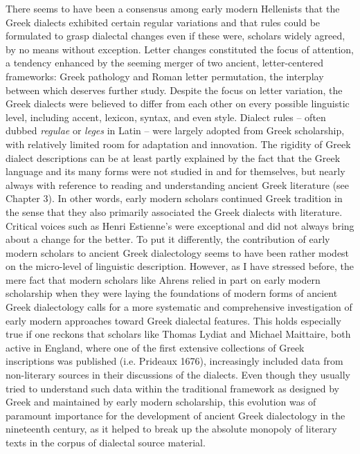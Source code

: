 \documentclass[12pt]{article}
\makeatletter
\renewcommand\subsection{\@startsection{subsection}{2}{0.1972in}{0.1665in}{0.0835in}{\normalfont\normalsize\fontsize{12pt}{14.4pt}\selectfont\rmfamily\bfseries}}
\newenvironment{styleStandard}{\renewcommand\baselinestretch{1.25}\setlength\leftskip{0in}\setlength\rightskip{0in}\setlength\parindent{0.1972in}\setlength\parfillskip{0pt plus 1fil}\setlength\parskip{0in plus 1pt}\writerlistparindent\writerlistleftskip\leavevmode\normalfont\normalsize\writerlistlabel\ignorespaces}{\unskip\vspace{0in plus 1pt}\par}
\newcommand\writerlistleftskip{}
\newcommand\writerlistparindent{}
\newcommand\writerlistlabel{}
\makeatother
\begin{document}
\subsection{Conclusion}
\hypertarget{Toc19704848}{}\begin{styleStandard}
There seems to have been a consensus among early modern Hellenists that the Greek dialects exhibited certain regular variations and that rules could be formulated to grasp dialectal changes even if these were, scholars widely agreed, by no means without exception. Letter changes constituted the focus of attention, a tendency enhanced by the seeming merger of two ancient, letter-centered frameworks: Greek pathology and Roman letter permutation, the interplay between which deserves further study. Despite the focus on letter variation, the Greek dialects were believed to differ from each other on every possible linguistic level, including accent, lexicon, syntax, and even style. Dialect rules – often dubbed \textit{regulae} or \textit{leges} in Latin – were largely adopted from Greek scholarship, with relatively limited room for adaptation and innovation. The rigidity of Greek dialect descriptions can be at least partly explained by the fact that the Greek language and its many forms were not studied in and for themselves, but nearly always with reference to reading and understanding ancient Greek literature (see Chapter 3). In other words, early modern scholars continued Greek tradition in the sense that they also primarily associated the Greek dialects with literature. Critical voices such as Henri Estienne’s were exceptional and did not always bring about a change for the better. To put it differently, the contribution of early modern scholars to ancient Greek dialectology seems to have been rather modest on the micro-level of linguistic description. However, as I have stressed before, the mere fact that modern scholars like Ahrens relied in part on early modern scholarship when they were laying the foundations of modern forms of ancient Greek dialectology calls for a more systematic and comprehensive investigation of early modern approaches toward Greek dialectal features. This holds especially true if one reckons that scholars like Thomas Lydiat and Michael Maittaire, both active in England, where one of the first extensive collections of Greek inscriptions was published (i.e. Prideaux 1676), increasingly included data from non-literary sources in their discussions of the dialects. Even though they usually tried to understand such data within the traditional framework as designed by Greek and maintained by early modern scholarship, this evolution was of paramount importance for the development of ancient Greek dialectology in the nineteenth century, as it helped to break up the absolute monopoly of literary texts in the corpus of dialectal source material.
\end{styleStandard}
\end{document}
